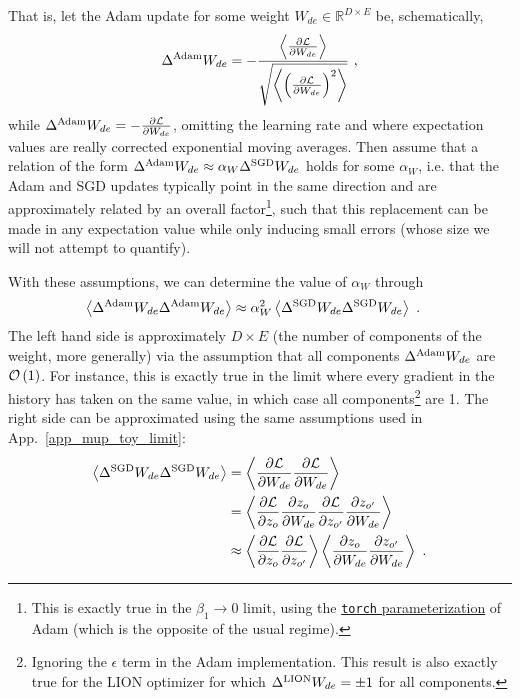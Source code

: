 That is, let the Adam update for some weight $ W_{ de }\in \mathbb{R}^{ D\times E } $ be, schematically,
 \begin{align}
 \Delta^{ {\rm Adam} }    W_{ de }  =- \frac{ \left\langle \frac{ \partial \mathcal{L} }{ \partial W_{ de } } \right\rangle }{ \sqrt{ \left\langle \left (\frac{ \partial \mathcal{L} }{ \partial W_{ de } }\right )^{ 2 } \right\rangle } } \ ,
 \end{align}
 while  $ \Delta^{ {\rm Adam} }    W_{ de } =- \frac{ \partial \mathcal{L} }{ \partial W_{ de } } $,
 omitting the learning rate and where expectation values are really corrected exponential moving
 averages.  Then assume that a relation of the form $ \Delta^{ {\rm Adam} }    W_{ de }\approx
 \alpha_{ W } \Delta^{ {\rm SGD} }    W_{ de } $ holds for some $ \alpha_{ W } $, i.e. that the Adam
 and SGD updates typically point in the same direction and are approximately related by an overall
 factor\footnote{This is exactly true in the $ \beta_{ 1  }\longrightarrow 0 $ limit, using the
 \href{https://pytorch.org/docs/stable/generated/torch.optim.Adam.html}{\texttt{torch}
parameterization} of Adam (which is the opposite of the usual regime).}, such that this replacement can be made in any expectation value while
only inducing small errors (whose size we will not attempt to quantify).

With these assumptions, we can determine the value of $ \alpha_{ W } $ through
 \begin{align}
     \left\langle \Delta^{ {\rm Adam} }    W_{ de }\Delta^{ {\rm Adam} }    W_{ de } \right\rangle
     &\approx \alpha_{ W }^{ 2 } \left\langle \Delta^{ {\rm SGD} }    W_{ de }\Delta^{ {\rm SGD} }    W_{ de } \right\rangle \ .
 \end{align}
The left hand side is approximately $ D\times E $ (the number of components of the weight, more
generally) via the assumption that all components $ \Delta^{ {\rm Adam} }    W_{ de } $ are $ \mathcal{O}
\left( 1 \right)  $. For instance, this is exactly true in the limit where every gradient in the
history has taken on the same value, in which case all components\footnote{Ignoring the $ \epsilon $
term in the Adam implementation. This result is also exactly true for the LION optimizer
\cite{chen2023symbolicdiscoveryoptimizationalgorithms} for which $ \Delta^{ {\rm LION} }    W_{ de }
=\pm 1 $ for all components.} are 1. The right side can be approximated using the same assumptions
used in App.~\ref{app_mup_toy_limit}:
\begin{align}
    \left\langle \Delta^{ {\rm SGD} }    W_{ de }\Delta^{ {\rm SGD} }    W_{ de } \right\rangle      &= \left\langle \frac{ \partial \mathcal{L} }{ \partial W_{ de } }\frac{ \partial \mathcal{L} }{ \partial W_{ de } } \right\rangle\nonumber\\
         &=\left\langle \frac{ \partial \mathcal{L} }{ \partial z_{ o } }\frac{ \partial z_{ o } }{ \partial W_{ de } }\frac{\partial \mathcal{L} }{ \partial z_{ o' } }\frac{ \partial z_{ o' } }{ \partial W_{ de } } \right\rangle\nonumber\\
         &\approx \left\langle \frac{ \partial \mathcal{L} }{ \partial z_{ o } }\frac{\partial \mathcal{L} }{ \partial z_{ o' } }\right\rangle \left \langle  \frac{ \partial z_{ o } }{ \partial W_{ de } }\frac{ \partial z_{ o' } }{ \partial W_{ de } } \right\rangle \ .
\end{align}

